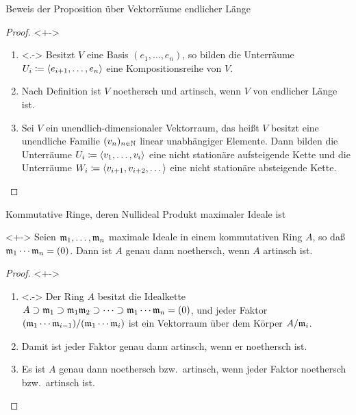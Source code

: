\begin{frame}{Beweis der Proposition über Vektorräume endlicher Länge}
	\begin{proof}<+->
		\begin{enumerate}[<+->]
		\item<.->
			Besitzt \(V\) eine Basis \((e_1, \dotsc, e_n)\), so bilden die Unterräume
			\(U_i \coloneqq \left\langle e_{i + 1}, \dotsc, e_n\right\rangle\) eine Kompositionsreihe von \(V\).
		\item
			Nach Definition ist \(V\) noethersch und artinsch, wenn \(V\) von endlicher Länge ist.
		\item
			Sei \(V\) ein unendlich-dimensionaler Vektorraum, das heißt \(V\) besitzt
			eine unendliche Familie \((v_n)_{n \in \mathbb N}\) linear unabhängiger Elemente.
			Dann bilden die Unterräume \(U_i \coloneqq \left\langle v_1, \dotsc, v_i\right\rangle\) eine
			nicht stationäre aufsteigende Kette und die Unterräume
			\(W_i \coloneqq \left\langle v_{i + 1}, v_{i + 2}, \dotsc\right\rangle\) eine nicht stationäre absteigende Kette.
			\qedhere
		\end{enumerate}
	\end{proof}
\end{frame}

\begin{frame}{Kommutative Ringe, deren Nullideal Produkt maximaler Ideale ist}
	\begin{corollary}<+->
		\label{cor:zero_is_prod_of_max}
		Seien \(\mathfrak{m}_1, \dotsc, \mathfrak{m}_n\) maximale Ideale in einem kommutativen
		Ring \(A\), so daß \(\mathfrak{m}_1 \dotsm \mathfrak{m}_n = (0)\). Dann ist
		\(A\) genau dann noethersch, wenn \(A\) artinsch ist.
	\end{corollary}
	\begin{proof}<+->
	\begin{enumerate}[<+->]
	\item<.->
		Der Ring \(A\) besitzt die Idealkette \(A \supset \mathfrak{m}_1 \supset
		\mathfrak{m}_1 \mathfrak{m}_2 \supset \dotsb \supset \mathfrak{m}_1 \dotsm \mathfrak{m}_n = (0)\),
		und jeder Faktor \((\mathfrak{m}_1 \dotsm \mathfrak{m}_{i - 1})/(\mathfrak{m}_1 \dotsm \mathfrak{m}_i)\)
		ist ein Vektorraum über dem Körper \(A/\mathfrak{m}_i\).
	\item
		Damit ist jeder Faktor genau dann artinsch, wenn er noethersch ist.
	\item
		Es ist \(A\) genau dann noethersch bzw.~artinsch, wenn jeder Faktor noethersch
		bzw.~artinsch ist.
		\qedhere
	\end{enumerate}
	\end{proof}
\end{frame}
